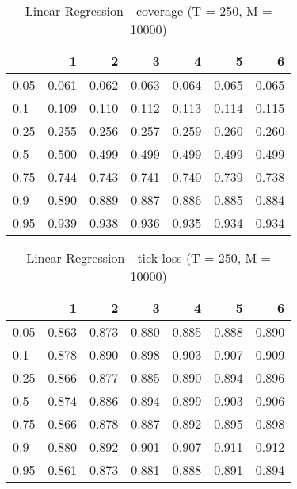 \documentclass{article}
\begin{document}
\begin{table}[h!]
\centering
\caption{Linear Regression - coverage (T = 250, M = 10000)}
\label{tab: Linear Regression cov}
\begin{tabular}{lrrrrrr}
\toprule
 & 1 & 2 & 3 & 4 & 5 & 6 \\
\midrule
0.05 & 0.061 & 0.062 & 0.063 & 0.064 & 0.065 & 0.065 \\
0.1 & 0.109 & 0.110 & 0.112 & 0.113 & 0.114 & 0.115 \\
0.25 & 0.255 & 0.256 & 0.257 & 0.259 & 0.260 & 0.260 \\
0.5 & 0.500 & 0.499 & 0.499 & 0.499 & 0.499 & 0.499 \\
0.75 & 0.744 & 0.743 & 0.741 & 0.740 & 0.739 & 0.738 \\
0.9 & 0.890 & 0.889 & 0.887 & 0.886 & 0.885 & 0.884 \\
0.95 & 0.939 & 0.938 & 0.936 & 0.935 & 0.934 & 0.934 \\
\bottomrule
\end{tabular}
\end{table}

\begin{table}[h!]
\centering
\caption{Linear Regression - tick loss (T = 250, M = 10000)}
\label{tab: Linear Regression tic}
\begin{tabular}{lrrrrrr}
\toprule
 & 1 & 2 & 3 & 4 & 5 & 6 \\
\midrule
0.05 & 0.863 & 0.873 & 0.880 & 0.885 & 0.888 & 0.890 \\
0.1 & 0.878 & 0.890 & 0.898 & 0.903 & 0.907 & 0.909 \\
0.25 & 0.866 & 0.877 & 0.885 & 0.890 & 0.894 & 0.896 \\
0.5 & 0.874 & 0.886 & 0.894 & 0.899 & 0.903 & 0.906 \\
0.75 & 0.866 & 0.878 & 0.887 & 0.892 & 0.895 & 0.898 \\
0.9 & 0.880 & 0.892 & 0.901 & 0.907 & 0.911 & 0.912 \\
0.95 & 0.861 & 0.873 & 0.881 & 0.888 & 0.891 & 0.894 \\
\bottomrule
\end{tabular}
\end{table}
\end{document}
